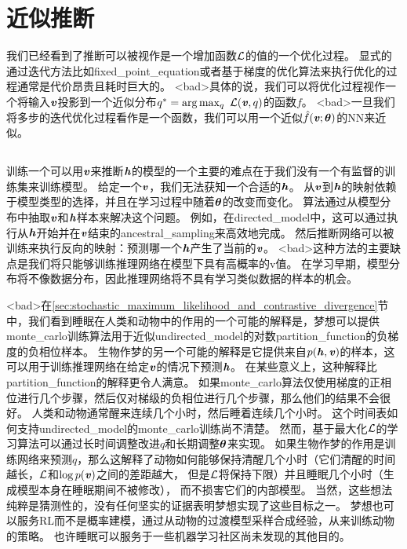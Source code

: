 \section{近似推断}
\label{sec:learned_approximate_inference}

我们已经看到了推断可以被视作是一个增加函数$\mathcal{L}$的值的一个优化过程。
显式的通过迭代方法比如\gls{fixed_point_equation}或者基于梯度的优化算法来执行优化的过程通常是代价昂贵且耗时巨大的。
<bad>具体的说，我们可以将优化过程视作一个将输入$\boldsymbol{\mathit{v}}$投影到一个近似分布$q^* = \arg\max_q\  \mathcal{L}(\boldsymbol{\mathit{v}},q)$的函数$f$。
<bad>一旦我们将多步的迭代优化过程看作是一个函数，我们可以用一个近似$\hat{f}(\boldsymbol{\mathit{v}};{\boldsymbol{\theta}})$的\gls{NN}来近似。


\subsection{}
\label{sec:wake_sleep}

训练一个可以用$\boldsymbol{\mathit{v}}$来推断$\boldsymbol{\mathit{h}}$的模型的一个主要的难点在于我们没有一个有监督的训练集来训练模型。
给定一个$\boldsymbol{\mathit{v}}$，我们无法获知一个合适的$\boldsymbol{\mathit{h}}$。
从$\boldsymbol{\mathit{v}}$到$\boldsymbol{\mathit{h}}$的映射依赖于模型类型的选择，并且在学习过程中随着${\boldsymbol{\theta}}$的改变而变化。
算法\citep{Hinton95,Frey96}通过从模型分布中抽取$\boldsymbol{\mathit{v}}$和$\boldsymbol{\mathit{h}}$样本来解决这个问题。
例如，在\gls{directed_model}中，这可以通过执行从$\boldsymbol{\mathit{h}}$开始并在$\boldsymbol{\mathit{v}}$结束的\gls{ancestral_sampling}来高效地完成。
然后推断网络可以被训练来执行反向的映射：预测哪一个$\boldsymbol{\mathit{h}}$产生了当前的$\boldsymbol{\mathit{v}}$。
<bad>这种方法的主要缺点是我们将只能够训练推理网络在模型下具有高概率的v值。
在学习早期，模型分布将不像数据分布，因此推理网络将不具有学习类似数据的样本的机会。


<bad>在\ref{sec:stochastic_maximum_likelihood_and_contrastive_divergence}节中，我们看到睡眠在人类和动物中的作用的一个可能的解释是，梦想可以提供\gls{monte_carlo}训练算法用于近似\gls{undirected_model}的对数\gls{partition_function}的负梯度的负相位样本。
生物作梦的另一个可能的解释是它提供来自$p(\boldsymbol{\mathit{h}},\boldsymbol{\mathit{v}})$的样本，这可以用于训练推理网络在给定$\boldsymbol{\mathit{v}}$的情况下预测$\boldsymbol{\mathit{h}}$。
在某些意义上，这种解释比\gls{partition_function}的解释更令人满意。
如果\gls{monte_carlo}算法仅使用梯度的正相位进行几个步骤，然后仅对梯级的负相位进行几个步骤，那么他们的结果不会很好。
人类和动物通常醒来连续几个小时，然后睡着连续几个小时。
这个时间表如何支持\gls{undirected_model}的\gls{monte_carlo}训练尚不清楚。
然而，基于最大化$\mathcal{L}$的学习算法可以通过长时间调整改进$q$和长期调整${\boldsymbol{\theta}}$来实现。
如果生物作梦的作用是训练网络来预测$q$，那么这解释了动物如何能够保持清醒几个小时（它们清醒的时间越长，$\mathcal{L}$和$\log p(\boldsymbol{\mathit{v}})$之间的差距越大， 但是$\mathcal{L}$将保持下限）并且睡眠几个小时（生成模型本身在睡眠期间不被修改）， 而不损害它们的内部模型。
当然，这些想法纯粹是猜测性的，没有任何坚实的证据表明梦想实现了这些目标之一。
梦想也可以服务\gls{RL}而不是概率建模，通过从动物的过渡模型采样合成经验，从来训练动物的策略。
也许睡眠可以服务于一些机器学习社区尚未发现的其他目的。




